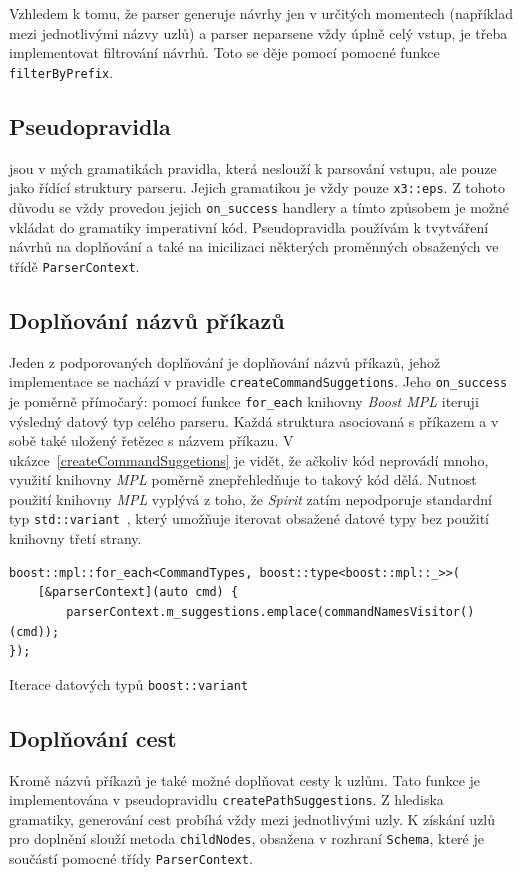 \documentclass[thesis=B,czech,hidelinks]{FITthesis}[2019/03/06]
\begin{document}
Vzhledem k tomu, že parser generuje návrhy jen v určitých momentech (například mezi jednotlivými názvy uzlů) a parser neparsene vždy úplně celý vstup, je třeba implementovat filtrování návrhů. Toto se děje pomocí pomocné funkce \texttt{filterByPrefix}.

\subsection{Pseudopravidla}
 jsou v mých gramatikách pravidla, která neslouží k parsování vstupu, ale pouze jako řídící struktury parseru. Jejich gramatikou je vždy pouze \texttt{x3::eps}. Z tohoto důvodu se vždy provedou jejich \texttt{on\_success} handlery a tímto způsobem je možné vkládat do gramatiky imperativní kód. Pseudopravidla používám k tvytváření návrhů na doplňování a také na inicilizaci některých proměnných obsažených ve třídě \texttt{ParserContext}.


\subsection{Doplňování názvů příkazů}\label{completing:commands}
Jeden z podporovaných doplňování je doplňování názvů příkazů, jehož implementace se nachází v pravidle \texttt{createCommandSuggetions}. Jeho \texttt{on\_success} je poměrně přímočarý: pomocí funkce \texttt{for\_each} knihovny \textit{Boost MPL} iteruji výsledný datový typ celého parseru. Každá struktura asociovaná s příkazem a v sobě také uložený řetězec s názvem příkazu. V ukázce~\ref{createCommandSuggetions} je vidět, že ačkoliv kód neprovádí mnoho, využití knihovny \textit{MPL} poměrně znepřehledňuje to takový kód dělá. Nutnost použití knihovny \textit{MPL} vyplývá z toho, že \textit{Spirit} zatím nepodporuje standardní typ \texttt{std::variant}~\cite{boost-variant}, který umožňuje iterovat obsažené datové typy bez použití knihovny třetí strany.

\begin{listing}
\begin{verbatim}
boost::mpl::for_each<CommandTypes, boost::type<boost::mpl::_>>(
    [&parserContext](auto cmd) {
        parserContext.m_suggestions.emplace(commandNamesVisitor()(cmd));
});
\end{verbatim}
\caption{Iterace datových typů \texttt{boost::variant}}\label{createCommandSuggetions}
\end{listing}


\subsection{Doplňování cest}
Kromě názvů příkazů je také možné doplňovat cesty k uzlům. Tato funkce je implementována v pseudopravidlu \texttt{createPathSuggestions}. Z hlediska gramatiky, generování cest probíhá vždy mezi jednotlivými uzly. K získání uzlů pro doplnění slouží metoda \texttt{childNodes}, obsažena v rozhraní \texttt{Schema}, které je součástí pomocné třídy \texttt{ParserContext}.
\end{document}
